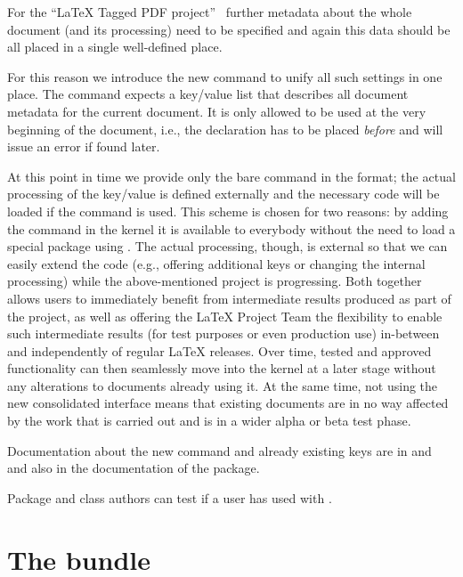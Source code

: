 \documentclass{ltnews}
\begin{document}
For the \enquote{\LaTeX{} Tagged PDF project}~\cite{35:blueprint}
further metadata about the whole document (and its processing) need to
be specified and again this data should be all placed in a single
well-defined place.

For this reason we introduce the new command  to
unify all such settings in one place.  The command expects a key/value
list that describes all document metadata for the current document. It
is only allowed to be used at the very beginning of the document,
i.e., the declaration has to be placed \emph{before}
 and will issue an error if found later.


At this point in time we provide only the bare command in the format;
the actual processing of the key/value is defined externally and the
necessary code will be loaded if the command is used. This scheme is
chosen for two reasons: by adding the command in the kernel it is
available to everybody without the need to load a special package
using . The actual processing, though, is external
so that we can easily extend the code (e.g., offering additional keys
or changing the internal processing) while the above-mentioned project
is progressing. Both together allows users to immediately benefit from
intermediate results produced as part of the project, as well as
offering the \LaTeX{} Project Team the flexibility to enable such
intermediate results (for test purposes or even production use)
in-between and independently of regular \LaTeX{} releases. Over time,
tested and approved functionality can then seamlessly move into the
kernel at a later stage without any alterations to documents already
using it. At the same time, not using the new consolidated interface
means that existing documents are in no way affected by the work that
is carried out and is in a wider alpha or beta test phase.

Documentation about the new command and
already existing keys are in  and 
and also in the documentation of the  package.

Package and class authors can test if a user has used 
with .


\section{The  bundle}
\end{document}
